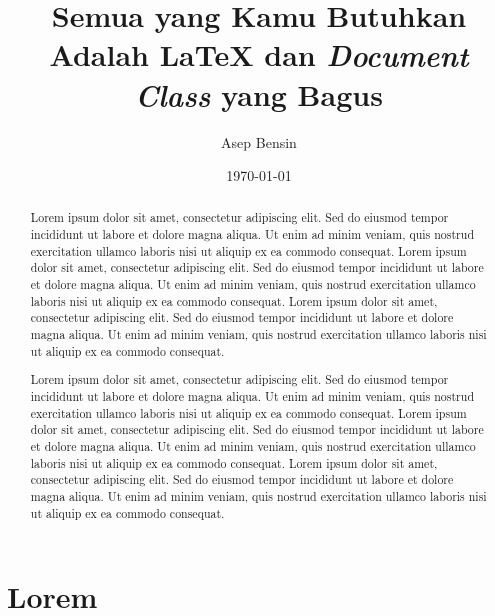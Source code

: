 \documentclass{skripsi}
\title[
en={All You Need Is LaTeX and A Nice Document Class}, 
id={Semua yang Kamu Butuhkan Adalah LaTeX dan \textit{Document Class} yang Bagus}
]{Semua yang Kamu Butuhkan Adalah LaTeX dan \textit{Document Class} yang Bagus}
\author[1234567890]{Asep Bensin}
\date{\today}
\begin{document}
\frontmatter
\maketitle
\originalitystatement
\onehalfspacing
\tableofcontents
\listoffigures
\listoftables
\begin{abstract}
    \noindent Lorem ipsum dolor sit amet, consectetur adipiscing elit. Sed do eiusmod tempor incididunt ut labore et dolore magna aliqua. Ut enim ad minim veniam, quis nostrud exercitation ullamco laboris nisi ut aliquip ex ea commodo consequat. Lorem ipsum dolor sit amet, consectetur adipiscing elit. Sed do eiusmod tempor incididunt ut labore et dolore magna aliqua. Ut enim ad minim veniam, quis nostrud exercitation ullamco laboris nisi ut aliquip ex ea commodo consequat. Lorem ipsum dolor sit amet, consectetur adipiscing elit. Sed do eiusmod tempor incididunt ut labore et dolore magna aliqua. Ut enim ad minim veniam, quis nostrud exercitation ullamco laboris nisi ut aliquip ex ea commodo consequat. \par
\end{abstract}%
\begin{otherlanguage}{english}
    \begin{itshape}
        \begin{abstract}
            \noindent Lorem ipsum dolor sit amet, consectetur adipiscing elit. Sed do eiusmod tempor incididunt ut labore et dolore magna aliqua. Ut enim ad minim veniam, quis nostrud exercitation ullamco laboris nisi ut aliquip ex ea commodo consequat. Lorem ipsum dolor sit amet, consectetur adipiscing elit. Sed do eiusmod tempor incididunt ut labore et dolore magna aliqua. Ut enim ad minim veniam, quis nostrud exercitation ullamco laboris nisi ut aliquip ex ea commodo consequat. Lorem ipsum dolor sit amet, consectetur adipiscing elit. Sed do eiusmod tempor incididunt ut labore et dolore magna aliqua. Ut enim ad minim veniam, quis nostrud exercitation ullamco laboris nisi ut aliquip ex ea commodo consequat. \par
        \end{abstract}%
    \end{itshape}
\end{otherlanguage}
\mainmatter
\onehalfspacing
\chapter{Lorem}
\end{document}
